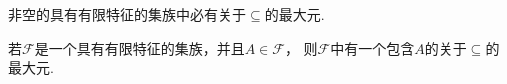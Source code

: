 \begin{theorem}[图基引理]
非空的具有有限特征的集族中必有关于\(\subseteq\)的最大元.
\end{theorem}

\begin{corollary}
若\(\mathscr{F}\)是一个具有有限特征的集族，并且\(A \in \mathscr{F}\)，
则\(\mathscr{F}\)中有一个包含\(A\)的关于\(\subseteq\)的最大元.
\end{corollary}
